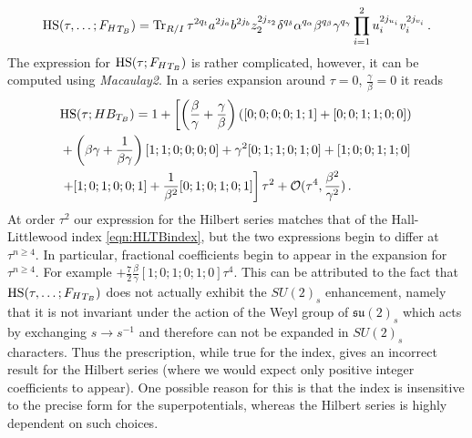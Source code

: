 \documentclass[main.tex]{subfiles}
\begin{document}
\begin{equation}
\textrm{HS}(\tau,\dots;{F_H}_{T_B})=\operatorname{Tr}_{R/I}\tau^{2q_t}a^{2j_a}b^{2j_b}z_2^{2j_{z_2}}\delta^{q_{\delta}}\alpha^{q_{\alpha}}\beta^{q_{\beta}}\gamma^{q_{\gamma}}\prod_{i=1}^2u_i^{2j_{u_i}}v_i^{2j_{v_i}}\,.
\end{equation}
The expression for $\textrm{HS}(\tau;{F_H}_{T_B})$ is rather complicated, however, it can be computed using \textit{Macaulay2}. In a series expansion around $\tau=0$, $\frac{\gamma}{\beta}=0$ it reads
\begin{equation}
\begin{aligned}
&\textrm{HS}(\tau;HB_{T_B})=1+\left[\left(\frac{\beta }{\gamma }+\frac{\gamma }{\beta }\right)([0;0;0;0;1;1]+[0;0;1;1;0;0])\right.\\
&+\left(\beta  \gamma +\frac{1}{\beta  \gamma }\right) [1;1;0;0;0;0]+\gamma ^2[0;1;1;0;1;0]+[1;0;0;1;1;0]\\
&\left.+[1;0;1;0;0;1]+\frac{1}{\beta^2}[0;1;0;1;0;1]\right]\tau^2+\mathcal{O}(\tau^4,\frac{\beta^2}{\gamma^2})\,.
\end{aligned}
\end{equation}
At order $\tau^2$ our expression for the Hilbert series matches that of the Hall-Littlewood index \eqref{eqn:HLTBindex}, but the two expressions begin to differ at $\tau^{n\geq4}$. In particular, fractional coefficients begin to appear in the expansion for $\tau^{n\geq4}$. For example \newline$+\frac{7}{2}\frac{\beta}{\gamma}[1;0;1;0;1;0]\tau^4$. This can be attributed to the fact that $\textrm{HS}(\tau,\dots;{F_H}_{T_B})$ does not actually exhibit the $SU(2)_s$ enhancement, namely that it is not invariant under the action of the Weyl group of $\mathfrak{su}(2)_s$ which acts by exchanging $s\to s^{-1}$ and therefore can not be expanded in $SU(2)_s$ characters. Thus the prescription, while true for the index, gives an incorrect result for the Hilbert series (where we would expect only positive integer coefficients to appear). One possible reason for this is that the index is insensitive to the precise form for the superpotentials, whereas the Hilbert series is highly dependent on such choices.
\end{document}
